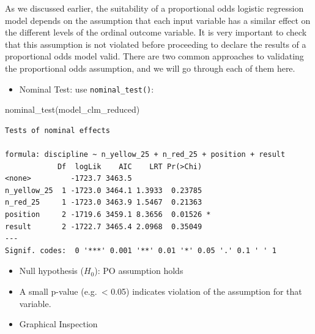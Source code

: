 \documentclass[
  letterpaper,
  DIV=11,
  numbers=noendperiod]{scrartcl}
\newenvironment{Shaded}{\begin{snugshade}}{\end{snugshade}}
\newcommand{\FunctionTok}[1]{\textcolor[rgb]{0.28,0.35,0.67}{#1}}
\newcommand{\NormalTok}[1]{\textcolor[rgb]{0.00,0.23,0.31}{#1}}
\providecommand{\tightlist}{%
  \setlength{\itemsep}{0pt}\setlength{\parskip}{0pt}}\usepackage{longtable,booktabs,array}
\begin{document}
As we discussed earlier, the suitability of a proportional odds logistic
regression model depends on the assumption that each input variable has
a similar effect on the different levels of the ordinal outcome
variable. It is very important to check that this assumption is not
violated before proceeding to declare the results of a proportional odds
model valid. There are two common approaches to validating the
proportional odds assumption, and we will go through each of them here.

\begin{itemize}
\tightlist
\item
  Nominal Test: use \texttt{nominal\_test()}:
\end{itemize}

\begin{Shaded}
\begin{Highlighting}[]
\FunctionTok{nominal\_test}\NormalTok{(model\_clm\_reduced)}
\end{Highlighting}
\end{Shaded}

\begin{verbatim}
Tests of nominal effects

formula: discipline ~ n_yellow_25 + n_red_25 + position + result
            Df  logLik    AIC    LRT Pr(>Chi)  
<none>         -1723.7 3463.5                  
n_yellow_25  1 -1723.0 3464.1 1.3933  0.23785  
n_red_25     1 -1723.0 3463.9 1.5467  0.21363  
position     2 -1719.6 3459.1 8.3656  0.01526 *
result       2 -1722.7 3465.4 2.0968  0.35049  
---
Signif. codes:  0 '***' 0.001 '**' 0.01 '*' 0.05 '.' 0.1 ' ' 1
\end{verbatim}

\begin{itemize}
\item
  Null hypothesis (\(H_0\)): PO assumption holds
\item
  A small p-value (e.g.~\textless{} 0.05) indicates violation of the
  assumption for that variable.
\item
  Graphical Inspection
\end{itemize}
\end{document}

